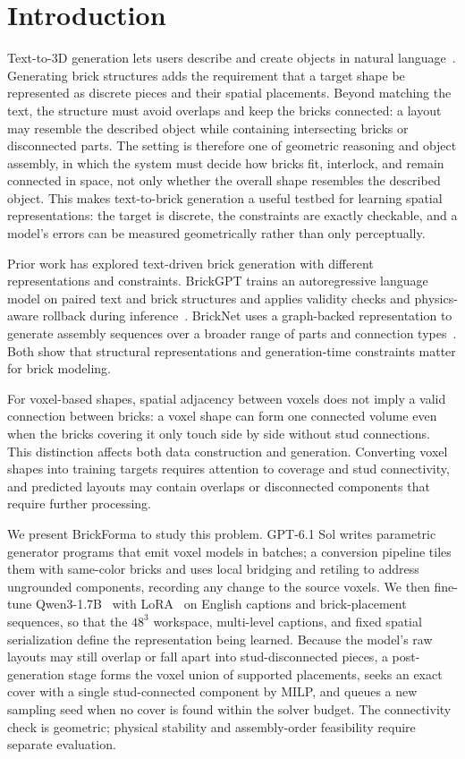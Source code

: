 \documentclass[letterpaper]{article} %
\begin{document}
\section{Introduction}
Text-to-3D generation lets users describe and create objects in natural language~\cite{dreamfusion}. Generating brick structures adds the requirement that a target shape be represented as discrete pieces and their spatial placements. Beyond matching the text, the structure must avoid overlaps and keep the bricks connected: a layout may resemble the described object while containing intersecting bricks or disconnected parts. The setting is therefore one of geometric reasoning and object assembly, in which the system must decide how bricks fit, interlock, and remain connected in space, not only whether the overall shape resembles the described object. This makes text-to-brick generation a useful testbed for learning spatial representations: the target is discrete, the constraints are exactly checkable, and a model's errors can be measured geometrically rather than only perceptually.

Prior work has explored text-driven brick generation with different representations and constraints. BrickGPT trains an autoregressive language model on paired text and brick structures and applies validity checks and physics-aware rollback during inference~\cite{brickgpt}. BrickNet uses a graph-backed representation to generate assembly sequences over a broader range of parts and connection types~\cite{bricknet}. Both show that structural representations and generation-time constraints matter for brick modeling.

For voxel-based shapes, spatial adjacency between voxels does not imply a valid connection between bricks: a voxel shape can form one connected volume even when the bricks covering it only touch side by side without stud connections. This distinction affects both data construction and generation. Converting voxel shapes into training targets requires attention to coverage and stud connectivity, and predicted layouts may contain overlaps or disconnected components that require further processing.

We present BrickForma to study this problem. GPT-6.1 Sol writes parametric generator programs that emit voxel models in batches; a conversion pipeline tiles them with same-color bricks and uses local bridging and retiling to address ungrounded components, recording any change to the source voxels. We then fine-tune Qwen3-1.7B~\cite{qwen3} with LoRA~\cite{lora} on English captions and brick-placement sequences, so that the $48^3$ workspace, multi-level captions, and fixed spatial serialization define the representation being learned. Because the model's raw layouts may still overlap or fall apart into stud-disconnected pieces, a post-generation stage forms the voxel union of supported placements, seeks an exact cover with a single stud-connected component by MILP, and queues a new sampling seed when no cover is found within the solver budget. The connectivity check is geometric; physical stability and assembly-order feasibility require separate evaluation.
\end{document}
